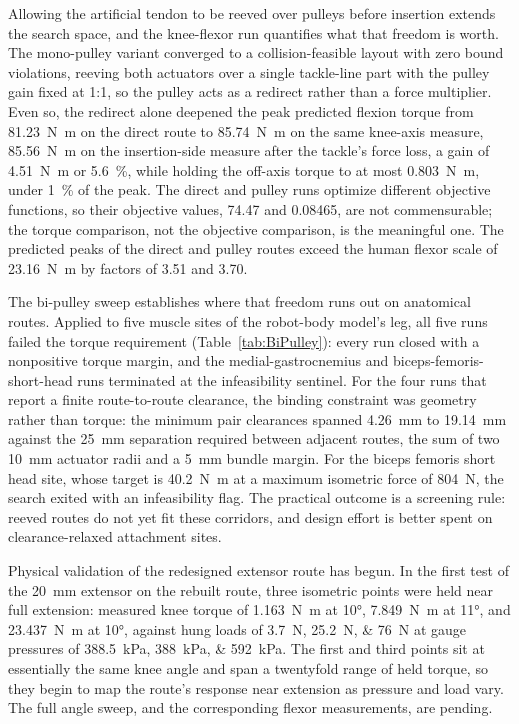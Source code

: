Allowing the artificial tendon to be reeved over pulleys before insertion extends the search space, and the knee-flexor run quantifies what that freedom is worth. The mono-pulley variant converged to a collision-feasible layout with zero bound violations, reeving both actuators over a single tackle-line part with the pulley gain fixed at 1:1, so the pulley acts as a redirect rather than a force multiplier. Even so, the redirect alone deepened the peak predicted flexion torque from \qty{81.23}{\newton\meter} on the direct route to \qty{85.74}{\newton\meter} on the same knee-axis measure, \qty{85.56}{\newton\meter} on the insertion-side measure after the tackle's force loss, a gain of \qty{4.51}{\newton\meter} or \qty{5.6}{\percent}, while holding the off-axis torque to at most \qty{0.803}{\newton\meter}, under \qty{1}{\percent} of the peak. The direct and pulley runs optimize different objective functions, so their objective values, 74.47 and 0.08465, are not commensurable; the torque comparison, not the objective comparison, is the meaningful one. The predicted peaks of the direct and pulley routes exceed the human flexor scale of \qty{23.16}{\newton\meter} by factors of 3.51 and 3.70.

The bi-pulley sweep establishes where that freedom runs out on anatomical routes. Applied to five muscle sites of the robot-body model's leg, all five runs failed the torque requirement (Table~\ref{tab:BiPulley}): every run closed with a nonpositive torque margin, and the medial-gastrocnemius and biceps-femoris-short-head runs terminated at the infeasibility sentinel. For the four runs that report a finite route-to-route clearance, the binding constraint was geometry rather than torque: the minimum pair clearances spanned \qty{4.26}{\mm} to \qty{19.14}{\mm} against the \qty{25}{\mm} separation required between adjacent routes, the sum of two \diameter\qty{10}{\mm} actuator radii and a \qty{5}{\mm} bundle margin. For the biceps femoris short head site, whose target is \qty{40.2}{\newton\meter} at a maximum isometric force of \qty{804}{\N}, the search exited with an infeasibility flag. The practical outcome is a screening rule: reeved routes do not yet fit these corridors, and design effort is better spent on clearance-relaxed attachment sites.

Physical validation of the redesigned extensor route has begun. In the first test of the \diameter\qty{20}{\mm} extensor on the rebuilt route, three isometric points were held near full extension: measured knee torque of \qty{1.163}{\newton\meter} at \ang{10}, \qty{7.849}{\newton\meter} at \ang{11}, and \qty{23.437}{\newton\meter} at \ang{10}, against hung loads of \qtylist{3.7;25.2;76}{\newton} at gauge pressures of \qtylist{388.5;388;592}{\kPa}. The first and third points sit at essentially the same knee angle and span a twentyfold range of held torque, so they begin to map the route's response near extension as pressure and load vary. The full angle sweep, and the corresponding flexor measurements, are pending.

